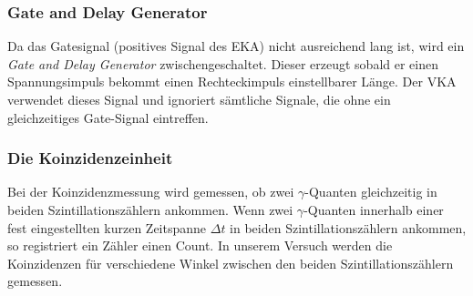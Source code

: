\subsubsection{Gate and Delay Generator}
Da das Gatesignal (positives Signal des EKA) nicht ausreichend lang ist, wird ein \emph{Gate and Delay Generator} zwischengeschaltet. Dieser erzeugt sobald er einen Spannungs\-impuls bekommt einen Rechteckimpuls einstellbarer Länge. Der VKA verwendet dieses Signal und ignoriert sämtliche Signale, die ohne ein gleichzeitiges Gate-Signal eintreffen.
 
\subsubsection{Die Koinzidenzeinheit}

Bei der Koinzidenzmessung wird gemessen, ob zwei $\gamma$-Quanten gleichzeitig in beiden Szintillationszählern ankommen. Wenn zwei $\gamma$-Quanten innerhalb einer fest eingestellten kurzen Zeitspanne $\Delta t$ in beiden Szintillationszählern ankommen, so registriert ein Zähler einen Count. In unserem Versuch werden die Koinzidenzen für verschiedene Winkel zwischen den beiden Szintillationszählern gemessen.
